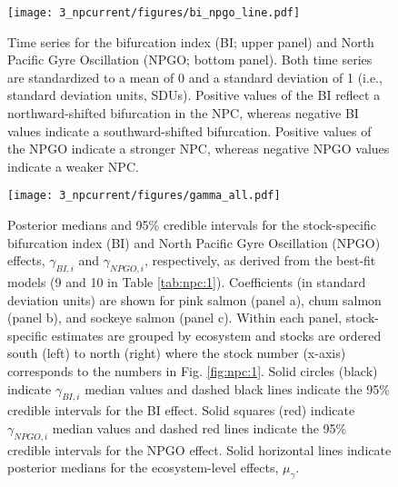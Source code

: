 \begin{figure}[htbp]
  \centering \texttt{[image: 3\_npcurrent/figures/bi\_npgo\_line.pdf]}
  \caption[Time series for the bifurcation index and North Pacific Gyre
           Oscillation]{Time series for the bifurcation index (BI; upper panel)
           and North Pacific Gyre Oscillation (NPGO; bottom panel). Both time
           series are standardized to a mean of 0 and a standard deviation of 1
           (i.e., standard deviation units, SDUs). Positive values of the BI
           reflect a northward-shifted bifurcation in the NPC, whereas negative
           BI values indicate a southward-shifted bifurcation. Positive values
           of the NPGO indicate a stronger NPC, whereas negative NPGO values
           indicate a weaker NPC.}
  \label{fig:npc:2}
\end{figure}

\begin{figure}[htbp]
  \centering \texttt{[image: 3\_npcurrent/figures/gamma\_all.pdf]}
  \caption[Posterior medians and 95\% credible intervals for the stock-specific
           bifurcation index and North Pacific Gyre Oscillation
           effects]{Posterior medians and 95\% credible intervals for the
           stock-specific bifurcation index (BI) and North Pacific Gyre
           Oscillation (NPGO) effects, \(\gamma_{BI,i}\) and
           \(\gamma_{NPGO,i}\), respectively, as derived from the best-fit
           models (9 and 10 in Table \ref{tab:npc:1}). Coefficients (in standard
           deviation units) are shown for pink salmon (panel a), chum salmon
           (panel b), and sockeye salmon (panel c). Within each panel,
           stock-specific estimates are grouped by ecosystem and stocks are
           ordered south (left) to north (right) where the stock number (x-axis)
           corresponds to the numbers in Fig. \ref{fig:npc:1}. Solid circles
           (black) indicate \(\gamma_{BI,i}\) median values and dashed black
           lines indicate the 95\% credible intervals for the BI effect. Solid
           squares (red) indicate \(\gamma_{NPGO,i}\) median values and dashed
           red lines indicate the 95\% credible intervals for the NPGO effect.
           Solid horizontal lines indicate posterior medians for the
           ecosystem-level effects, \(\mu_{\gamma}\).}
  \label{fig:npc:3}
\end{figure}

